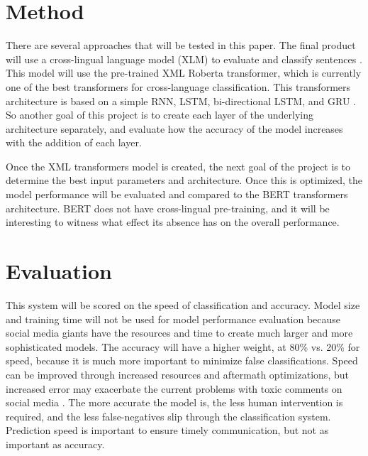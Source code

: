 \documentclass{article}
\begin{document}
\section{Method}

There are several approaches that will be tested in this paper. The final product will use a cross-lingual language model (XLM) to evaluate and classify sentences \cite{lample2019crosslingual}. This model will use the pre-trained XML Roberta transformer, which is currently one of the best transformers for cross-language classification. This transformers architecture is based on a simple RNN, LSTM, bi-directional LSTM, and GRU \cite{lample2019crosslingual}. So another goal of this project is to create each layer of the underlying architecture separately, and evaluate how the accuracy of the model increases with the addition of each layer.

Once the XML transformers model is created, the next goal of the project is to determine the best input parameters and architecture. Once this is optimized, the model performance will be evaluated and compared to the BERT transformers architecture. BERT does not have cross-lingual pre-training, and it will be interesting to witness what effect its absence has on the overall performance.

\section{Evaluation}

This system will be scored on the speed of classification and accuracy. Model size and training time will not be used for model performance evaluation because social media giants have the resources and time to create much larger and more sophisticated models. The accuracy will have a higher weight, at 80\% vs. 20\% for speed, because it is much more important to minimize false classifications. Speed can be improved through increased resources and aftermath optimizations, but increased error may exacerbate the current problems with toxic comments on social media \cite{10.1145/3200947.3208069}. The more accurate the model is, the less human intervention is required, and the less false-negatives slip through the classification system. Prediction speed is important to ensure timely communication, but not as important as accuracy.

\begin{footnotesize}


\end{footnotesize}%
\end{document}
